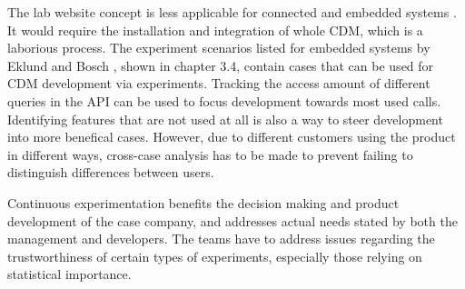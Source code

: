 \documentclass[english]{tktltiki2}
\theoremstyle{definition}
\theoremstyle{remark}
\begin{document}
The lab website concept is less applicable for connected and embedded systems \cite{bosch2012building}. It would require the installation and integration of whole CDM, which is a laborious process. The experiment scenarios listed for embedded systems by Eklund and Bosch \cite{eklund2012architecture}, shown in chapter 3.4, contain cases that can be used for CDM development via experiments. Tracking the access amount of different queries in the API can be used to focus development towards most used calls. Identifying features that are not used at all is also a way to steer development into more benefical cases. However, due to different customers using the product in different ways, cross-case analysis has to be made to prevent failing to distinguish differences between users.  

Continuous experimentation benefits the decision making and product development of the case company, and addresses actual needs stated by both the management and developers. The teams have to address issues regarding the trustworthiness of certain types of experiments, especially those relying on statistical importance. %
% 









\end{document}
